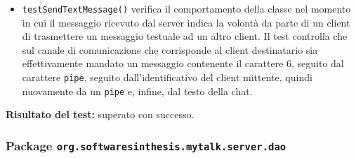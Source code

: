 \begin{itemize}
\begin{itemize}
\item \texttt{testSendTextMessage()} verifica il comportamento della classe nel momento in cui il messaggio ricevuto dal server indica la volontà da parte di un client di trasmettere un messaggio testuale ad un altro client. Il test controlla che sul canale di comunicazione che corrisponde al client destinatario sia effettivamente mandato un messaggio contenente il carattere 6, seguito dal carattere \texttt{pipe}, seguito dall'identificativo del client mittente, quindi nuovamente da un \texttt{pipe} e, infine, dal testo della chat.

\end{itemize}
\textbf{Risultato del test:} superato con successo.
\end{itemize}


\subsubsection{Package \texttt{org.softwaresinthesis.mytalk.server.dao}}
